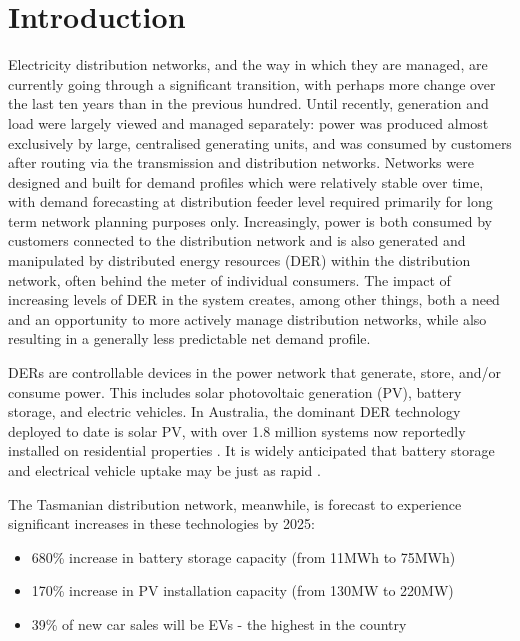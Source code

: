 \documentclass[conference]{IEEEtran}
\begin{document}
\section{Introduction}
Electricity distribution networks, and the way in which they are managed, are currently going through a significant transition, with perhaps more change over the last ten years than in the previous hundred. %
Until recently, generation and load were largely viewed and managed separately: power was produced almost exclusively by large, centralised generating units, and was consumed by customers after routing via %
the transmission and distribution networks. 
Networks were designed and built for demand profiles which were relatively stable over time, with demand forecasting at distribution feeder level required primarily for long term network planning purposes only. 
Increasingly, power is both consumed by customers connected to the distribution network and is also generated and manipulated by distributed energy resources (DER) within the distribution network, often behind the meter of individual consumers. 
The impact of increasing levels of DER in the system creates, among other things, both a need and an opportunity to more actively manage distribution networks, while also resulting in a generally less predictable net demand profile.

DERs are controllable devices in the power network that generate, store, and/or consume power. 
This includes solar photovoltaic generation (PV), battery storage, and electric vehicles. 
In Australia, the dominant DER technology deployed to date is solar PV, with over 1.8 million systems now reportedly installed on residential properties \cite{apvi2017}. 
It is widely anticipated that battery storage and electrical vehicle uptake may be just as rapid \cite{bloomberg2018}.

The Tasmanian distribution network, meanwhile, is forecast to experience significant increases in these technologies by 2025: \\
\begin{itemize}
	\item 680\% increase in battery storage capacity (from 11MWh to 75MWh) \cite{Jacobs2017}
	\item 170\% increase in PV installation capacity (from 130MW to 220MW) \cite{Jacobs2017}
	\item 39\% of new car sales will be EVs - the highest in the country \cite{AEMO2016}
\end{itemize}
\end{document}
